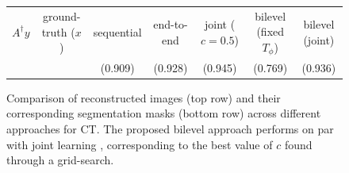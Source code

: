 \begin{figure}[htbp]
\begin{tabular}{c | c c c c c c}
        \scriptsize $A^{\dagger}y$ &
        \scriptsize ground-truth ($x$) &  
        \scriptsize sequential & 
        \scriptsize end-to-end & 
        \scriptsize joint ($c=0.5$) & 
        \scriptsize bilevel (fixed $T_{\phi}$) & 
        \scriptsize bilevel (joint) \\
        &
        &
        \scriptsize (0.909) &
        \scriptsize (0.928) &
        \scriptsize (0.945) &
        \scriptsize (0.769) &
        \scriptsize (0.936) \\
    \end{tabular}
    \vspace{10pt} %
    \caption{Comparison of reconstructed images (top row) and their corresponding segmentation masks (bottom row) across different approaches for CT. The proposed bilevel approach performs on par with joint learning \cite{adler2022task}, corresponding to the best value of $c$ found through a grid-search.}
    \label{fig:reconstruction_and_masks_ct}
\end{figure}

